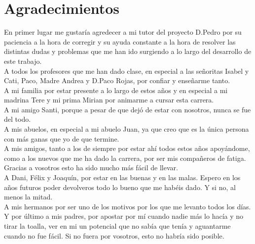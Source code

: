 \chapter*{Agradecimientos}
\thispagestyle{empty}

       \vspace{1cm}


En primer lugar me gustaría agredecer a mi tutor del proyecto D.Pedro por su paciencia a la hora de corregir y su ayuda constante a la hora de resolver las distintas dudas y problemas que me han ido surgiendo a lo largo del desarrollo de este trabajo.\\
A todos los profesores que me han dado clase, en especial a las señoritas Isabel y Cati, Paco, Madre Andrea y D.Paco Rojas, por confiar y enseñarme tanto.\\
A mi familia por estar presente a lo largo de estos años y en especial a mi madrina Tere y mi prima Mirian por animarme a cursar esta carrera.\\
A mi amigo Santi, porque a pesar de que dejó de estar con nosotros, nunca se fue del todo.\\
A mis abuelos, en especial a mi abuelo Juan, ya que creo que es la única persona con más ganas que yo de que termine.\\
A mis amigos, tanto a los de siempre por estar ahí todos estos años apoyándome, como  a los nuevos que me ha dado la carrera, por ser mis compañeros de fatiga. Gracias a vosotros esto ha sido mucho más fácil de llevar.\\
A Dani, Félix y Joaquín, por estar en las buenas y en las malas. Espero en los años futuros poder devolveros todo lo bueno que me habéis dado. Y si no, al menos la mitad.\\
A mis hermanos por ser uno de los motivos por los que me levanto todos los días.\\
Y por último a mis padres, por apostar por mí cuando nadie más lo hacía y no tirar la toalla, ver en mi un potencial que no sabía que tenía y aguantarme cuando no fue fácil. Si no fuera por vosotros, esto no habría sido posible.

